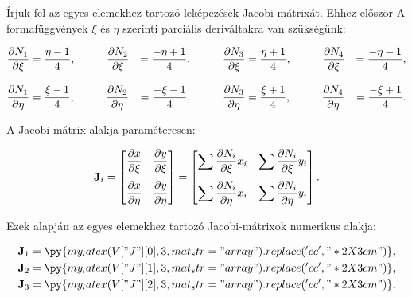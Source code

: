 Írjuk fel az egyes elemekhez tartozó leképezések Jacobi-mátrixát. Ehhez először
A formafüggvények $\xi$ és $\eta$ szerinti parciális deriváltakra van szükségünk:
\begin{myframe}
  \begin{alignat}{9}
    \pdv{N_1}{\xi}  & = \frac{\eta - 1}{4}
    \text, \qquad \quad
    \pdv{N_2}{\xi}  & = \frac{-\eta + 1}{4}
    \text, \qquad \quad
    \pdv{N_3}{\xi}  & = \frac{\eta + 1}{4}
    \text, \qquad \quad
    \pdv{N_4}{\xi}  & = \frac{-\eta - 1}{4}
    \text,                                  \\[3mm]
    \pdv{N_1}{\eta} & = \frac{\xi - 1}{4}
    \text, \qquad \quad
    \pdv{N_2}{\eta} & = \frac{-\xi - 1}{4}
    \text, \qquad \quad
    \pdv{N_3}{\eta} & = \frac{\xi + 1}{4}
    \text, \qquad \quad
    \pdv{N_4}{\eta} & = \frac{-\xi + 1}{4}
    \text.
  \end{alignat}
\end{myframe}
A Jacobi-mátrix alakja paraméteresen:
\begin{myframe}
  \begin{equation}
    \mathbf{J}_i = \begin{bmatrix}
      \displaystyle \pdv{x}{\xi}  &
      \displaystyle \pdv{y}{\xi}    \\[4mm]
      \displaystyle \pdv{x}{\eta} &
      \displaystyle \pdv{y}{\eta}   \\
    \end{bmatrix} = \begin{bmatrix}
      \displaystyle \sum \pdv{N_i}{\xi} x_i  &
      \displaystyle \sum \pdv{N_i}{\xi} y_i    \\[4mm]
      \displaystyle \sum \pdv{N_i}{\eta} x_i &
      \displaystyle \sum \pdv{N_i}{\eta} y_i   \\
    \end{bmatrix}
    \text.
  \end{equation}
\end{myframe}
Ezek alapján az egyes elemekhez tartozó Jacobi-mátrixok numerikus alakja:
\begin{myframe}
  \begin{align}
    \rmat J_1 & =
    \py{my_latex(V["J"][0], 3, mat_str="array").replace('cc', "*{2}{X{3cm}}")}
    \text,
    \\
    \rmat J_2 & =
    \py{my_latex(V["J"][1], 3, mat_str="array").replace('cc', "*{2}{X{3cm}}")}
    \text,
    \\
    \rmat J_3 & =
    \py{my_latex(V["J"][2], 3, mat_str="array").replace('cc', "*{2}{X{3cm}}")}
    \text.
  \end{align}
\end{myframe}
